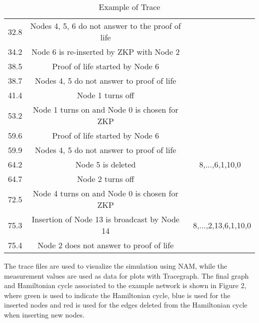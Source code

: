 \documentclass{article}
\begin{document}
\begin{table}
\begin{center}
\begin{tabular}{|c|c|c|}
32.8 & \scriptsize{Nodes 4, 5, 6 do not answer to the proof of
life}  & \\

34.2 &\scriptsize{ Node 6 is re-inserted by ZKP with Node 2} &
\\

38.5 & \scriptsize{Proof of life started by Node 6} & \\

38.7 & \scriptsize{Nodes 4, 5 do not answer to  proof of life} &
\\

41.4 & \scriptsize{Node 1 turns off} & \\

53.2 & \scriptsize{Node 1 turns on and Node 0 is chosen for ZKP}&
\\

59.6 &\scriptsize{ Proof of life started by Node 6}& \\

59.9 & \scriptsize{Nodes 4, 5 do not answer to proof of life}&
\\

64.2 & \scriptsize{ Node 5 is deleted} &
\scriptsize{8,...,6,1,10,0}\\

64.7 & \scriptsize{Node 2 turns off} & \\

72.5 & \scriptsize{Node 4  turns on and Node 0 is chosen for ZKP}
& \\

75.3 & \scriptsize{Insertion of Node 13 is broadcast by Node 14} &
\ \scriptsize{8,...,2,13,6,1,10,0}  \\

75.4 & \scriptsize{Node 2 does not answer to proof of life} &
\\

 \hline
\end{tabular}
\caption{Example of Trace} \label{tab:Trace}
\end{center}

\end{table}

The trace files are used to visualize the simulation using NAM,
while the measurement values are used as data for plots with
Tracegraph. The final graph and Hamiltonian cycle associated to
the example network is shown in Figure 2, where green is used to indicate the Hamiltonian cycle, blue is used for
the inserted nodes and red is used for the
 edges deleted from the Hamiltonian cycle when inserting new
 nodes.
\end{document}
